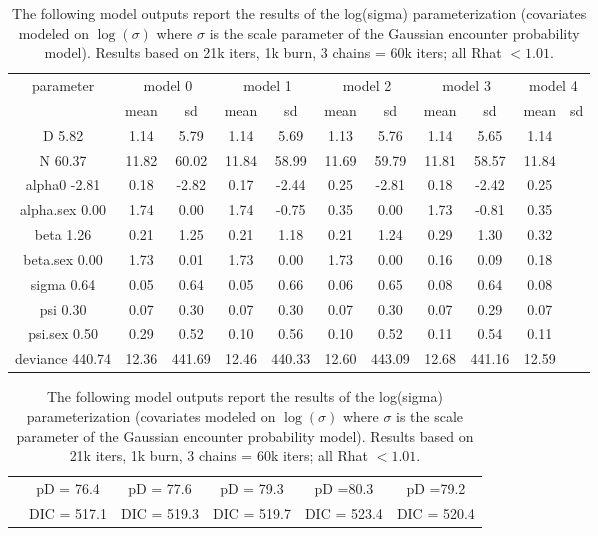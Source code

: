 \begin{table}[htp]
\centering
\caption{
The following model outputs report the results of the log(sigma)
parameterization (covariates modeled on $\log(\sigma)$ where $\sigma$ is the
scale parameter of the Gaussian encounter probability model).
Results based on
21k iters, 1k burn, 3 chains = 60k iters;
all Rhat $< 1.01$.
}
\begin{tabular}{ccccccccccc} \hline \hline
parameter & \multicolumn{2}{c}{model 0} &
\multicolumn{2}{c}{model 1} &
\multicolumn{2}{c}{model 2} &
\multicolumn{2}{c}{model 3} &
\multicolumn{2}{c}{model 4}  \\
        &    mean &   sd &      mean &   sd &      mean &   sd &
        mean&     sd  & mean & sd\\ \hline
D           5.82 & 1.14 &  5.79&  1.14&   5.69&  1.13&   5.76&  1.14&
5.65&  1.14 \\
N          60.37 &11.82 & 60.02& 11.84&  58.99& 11.69&  59.79& 11.81&
58.57& 11.84 \\
alpha0     -2.81 & 0.18 & -2.82&  0.17&  -2.44&  0.25&  -2.81&  0.18&
-2.42&  0.25 \\
alpha.sex   0.00 & 1.74 &  0.00&  1.74&  -0.75&  0.35&   0.00&  1.73&
-0.81&  0.35 \\
beta        1.26 & 0.21 &  1.25&  0.21&   1.18&  0.21&   1.24&  0.29&
1.30&  0.32 \\
beta.sex    0.00 & 1.73 &  0.01&  1.73&   0.00&  1.73&   0.00&  0.16&
0.09&  0.18 \\
sigma       0.64 & 0.05 &  0.64&  0.05&   0.66&  0.06&   0.65&  0.08&
0.64&  0.08 \\
psi         0.30 & 0.07 &  0.30&  0.07&   0.30&  0.07&   0.30&  0.07&
0.29&  0.07 \\
psi.sex     0.50 & 0.29 &  0.52&  0.10&   0.56&  0.10&   0.52&  0.11&
0.54&  0.11 \\
deviance  440.74 &12.36 &441.69& 12.46& 440.33& 12.60& 443.09& 12.68&
441.16& 12.59 \\
\end{tabular}
\begin{tabular}{ccccccccccc}
& \multicolumn{2}{c}{pD = 76.4} &\multicolumn{2}{c}{pD = 77.6} & \multicolumn{2}{c}{pD = 79.3}
& \multicolumn{2}{c}{pD =80.3}  & \multicolumn{2}{c}{pD =79.2}  \\
& \multicolumn{2}{c}{DIC = 517.1} & \multicolumn{2}{c}{DIC = 519.3} &
\multicolumn{2}{c}{DIC = 519.7} &    \multicolumn{2}{c}{DIC = 523.4} & \multicolumn{2}{c}{DIC = 520.4}
\end{tabular}
\label{gof.tab.dic}
\end{table}





